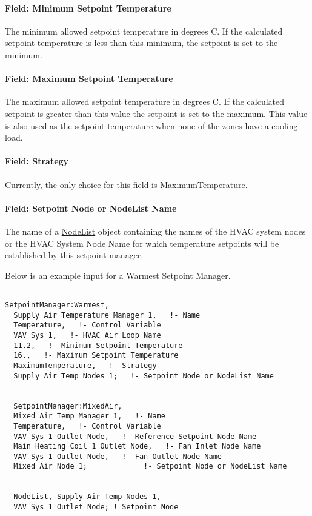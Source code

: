 \paragraph{Field: Minimum Setpoint Temperature}\label{field-minimum-setpoint-temperature-1}

The minimum allowed setpoint temperature in degrees C. If the calculated setpoint temperature is less than this minimum, the setpoint is set to the minimum.

\paragraph{Field: Maximum Setpoint Temperature}\label{field-maximum-setpoint-temperature-1}

The maximum allowed setpoint temperature in degrees C. If the calculated setpoint is greater than this value the setpoint is set to the maximum. This value is also used as the setpoint temperature when none of the zones have a cooling load.

\paragraph{Field: Strategy}\label{field-strategy}

Currently, the only choice for this field is MaximumTemperature.

\paragraph{Field: Setpoint Node or NodeList Name}\label{field-setpoint-node-or-nodelist-name-10}

The name of a \hyperref[nodelist]{NodeList} object containing the names of the HVAC system nodes or the HVAC System Node Name for which temperature setpoints will be established by this setpoint manager.

Below is an example input for a Warmest Setpoint Manager.

\begin{lstlisting}

SetpointManager:Warmest,
  Supply Air Temperature Manager 1,   !- Name
  Temperature,   !- Control Variable
  VAV Sys 1,   !- HVAC Air Loop Name
  11.2,   !- Minimum Setpoint Temperature
  16.,   !- Maximum Setpoint Temperature
  MaximumTemperature,   !- Strategy
  Supply Air Temp Nodes 1;   !- Setpoint Node or NodeList Name


  SetpointManager:MixedAir,
  Mixed Air Temp Manager 1,   !- Name
  Temperature,   !- Control Variable
  VAV Sys 1 Outlet Node,   !- Reference Setpoint Node Name
  Main Heating Coil 1 Outlet Node,   !- Fan Inlet Node Name
  VAV Sys 1 Outlet Node,   !- Fan Outlet Node Name
  Mixed Air Node 1;             !- Setpoint Node or NodeList Name


  NodeList, Supply Air Temp Nodes 1,
  VAV Sys 1 Outlet Node; ! Setpoint Node
\end{lstlisting}

